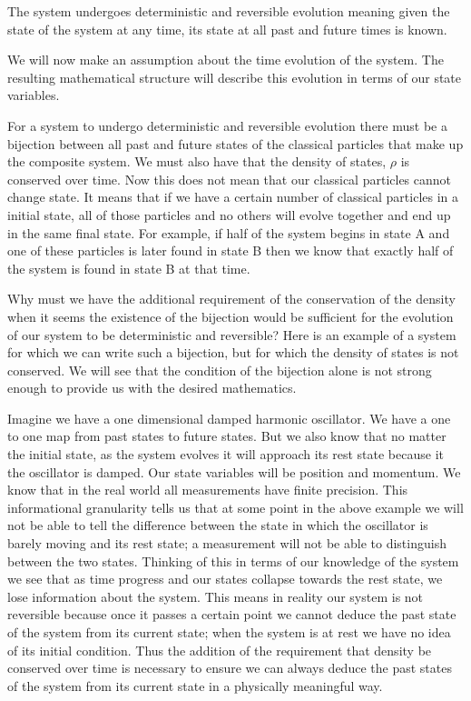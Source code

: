 \documentclass{article}[a4paper]
\begin{document}
\begin{assump}
	The system undergoes deterministic and reversible evolution meaning given the state of the system at any time, its state at all past and future times is known.
\end{assump}

	We will now make an assumption about the time evolution of the system. The resulting mathematical structure will describe this evolution in terms of our state variables.

	For a system to undergo deterministic and reversible evolution there must be a bijection between all past and future states of the classical particles that make up the composite system. We must also have that the density of states, $\rho$ is conserved over time. Now this does not mean that our classical particles cannot change state. It means that if we have a certain number of classical particles in a initial state, all of those particles and no others will evolve together and end up in the same final state. For example, if half of the system begins in state A and one of these particles is later found in state B then we know that exactly half of the system is found in state B at that time.
	
	Why must we have the additional requirement of the conservation of the density when it seems the existence of the bijection would be sufficient for the evolution of our system to be deterministic and reversible? Here is an example of a system for which we can write such a bijection, but for which the density of states is not conserved. We will see that the condition of the bijection alone is not strong enough to provide us with the desired mathematics.
	
	Imagine we have a one dimensional damped harmonic oscillator. We have a one to one map from past states to future states. But we also know that no matter the initial state, as the system evolves it will approach its rest state because it the oscillator is damped. Our state variables will be position and momentum. We know that in the real world all measurements have finite precision. This informational granularity tells us that at some point in the above example we will not be able to tell the difference between the state in which the oscillator  is barely moving and its rest state; a measurement will not be able to distinguish between the two states. Thinking of this in terms of our knowledge of the system we see that as time progress and our states collapse towards the rest state, we lose information about the system. This means in reality our system is not reversible because once it passes a certain point we cannot deduce the past state of the system from its current state; when the system is at rest we have no idea of its initial condition. Thus the addition of the requirement that density be conserved over time is necessary to ensure we can always deduce the past states of the system from its current state in a physically meaningful way.
	
\end{document}
